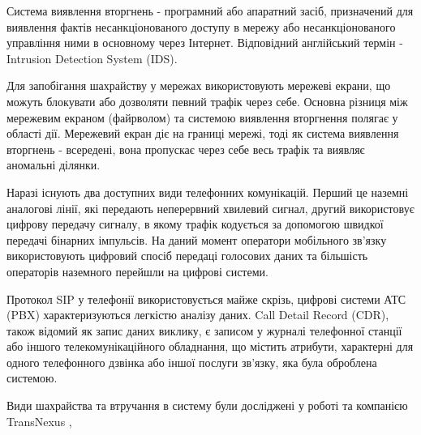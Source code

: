   Система виявлення вторгнень - програмний або апаратний засіб, призначений для виявлення фактів несанкціонованого доступу в мережу або несанкціонованого управління ними в основному через Інтернет. Відповідний англійський термін - Intrusion Detection System (IDS).

  Для запобігання шахрайству у мережах використовують мережеві екрани, що можуть блокувати або дозволяти певний трафік через себе.
  Основна різниця між мережевим екраном (файрволом) та системою виявлення вторгнення полягає у області дії. Мережевий екран діє на границі мережі, тоді як система виявлення вторгнень - всередені, вона пропускає через себе весь трафік та виявляє аномальні ділянки.

  Наразі існують два доступних види телефонних комунікацій. Перший це наземні аналогові лінії, які передають неперервний хвилевий сигнал, другий використовує цифрову передачу сигналу, в якому трафік кодується за допомогою швидкої передачі бінарних імпульсів. На даний момент оператори мобільного зв'язку використовують цифровий спосіб передаці голосових даних та більшість операторів наземного перейшли на цифрові системи.

  Протокол SIP у телефонії використовується майже скрізь, цифрові системи АТС (PBX) характеризуються легкістю аналізу даних. Call Detail Record (CDR), також відомий як запис даних виклику, є записом у журналі телефонної станції або іншого телекомунікаційного обладнання, що містить атрибути, характерні для одного телефонного дзвінка або іншої послуги зв'язку, яка була оброблена системою.

  Види шахрайства та втручання в систему були досліджені у роботі \cite{barson1996detection} та компанією TransNexus \cite{transnexus2012voipfraud},

